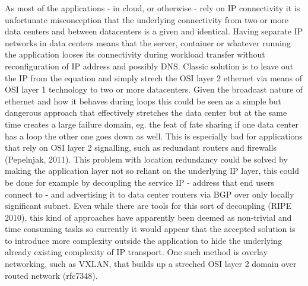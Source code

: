\documentclass{article}
\begin{document}
\par
As most of the applications - in cloud, or otherwise - rely on IP connectivity it is unfortunate misconception that the underlying connectivity from two or more data centers and between datacenters is a given and identical. Having separate IP networks in data centers means that the server, container or whatever running the application looses its connectivity during workload transfer without reconfiguration of IP address and possibly DNS. Classic solution is to leave out the IP from the equation and simply strech the OSI layer 2 ethernet via means of OSI layer 1 technology to two or more datacenters. Given the broadcast nature of ethernet and how it behaves during loops this could be seen as a simple but dangerous approach that effectively stretches the data center but at the same time creates a large failure domain, eg. the feat of fate sharing if one data center has a loop the other one goes down as well. This is especially bad for applications that rely on OSI layer 2 signalling, such as redundant routers and firewalls (Pepelnjak, 2011). This problem with location redundancy could be solved by making the application layer not so reliant on the underlying IP layer, this could be done for example by decoupling the service IP - address that end users connect to - and advertising it to data center routers via BGP over only locally significant subnet. Even while there are tools for this sort of decoupling (RIPE 2010), this kind of approaches have apparently been deemed as non-trivial and time consuming tasks so currently it would appear that the accepted solution is to introduce more complexity outside the application to hide the underlying already existing complexity of IP transport. One such method is overlay networking, such as VXLAN, that builds up a streched OSI layer 2 domain over routed network (rfc7348).
\par
\end{document}
